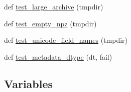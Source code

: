 \begin{DoxyCompactItemize}
\item 
def \hyperlink{namespacenumpy_1_1lib_1_1tests_1_1test__format_a2f38a73fd0d5e5f3e357090cef6648d4}{test\+\_\+large\+\_\+archive} (tmpdir)
\item 
def \hyperlink{namespacenumpy_1_1lib_1_1tests_1_1test__format_a94ac749dc0718de2aa7c902e88338e5d}{test\+\_\+empty\+\_\+npz} (tmpdir)
\item 
def \hyperlink{namespacenumpy_1_1lib_1_1tests_1_1test__format_a7d67e4722aa02802cb6acb95ad310edd}{test\+\_\+unicode\+\_\+field\+\_\+names} (tmpdir)
\item 
def \hyperlink{namespacenumpy_1_1lib_1_1tests_1_1test__format_a3fb6d6220a432dd67fb0f6ff860557a9}{test\+\_\+metadata\+\_\+dtype} (dt, fail)
\end{DoxyCompactItemize}
\subsection*{Variables}
